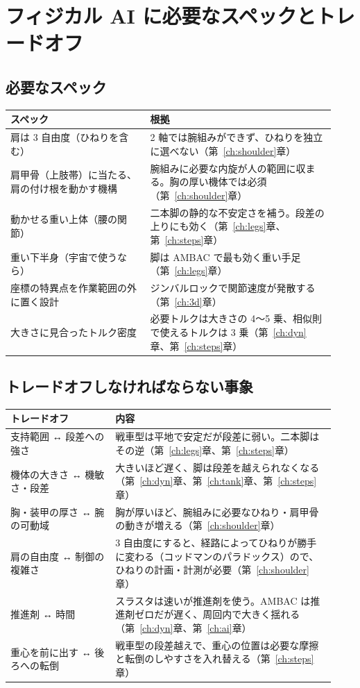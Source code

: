 \section{フィジカル AI に必要なスペックとトレードオフ}

\subsection{必要なスペック}

\begin{longtable}{p{0.40\linewidth}p{0.53\linewidth}}
\toprule
スペック & 根拠 \\ \midrule \endhead
肩は 3 自由度（ひねりを含む） & 2 軸では腕組みができず、ひねりを独立に選べない（第~\ref{ch:shoulder}章） \\
肩甲骨（上肢帯）に当たる、肩の付け根を動かす機構 & 腕組みに必要な内旋が人の範囲に収まる。胸の厚い機体では必須（第~\ref{ch:shoulder}章） \\
動かせる重い上体（腰の関節） & 二本脚の静的な不安定さを補う。段差の上りにも効く（第~\ref{ch:legs}章、第~\ref{ch:steps}章） \\
重い下半身（宇宙で使うなら） & 脚は AMBAC で最も効く重い手足（第~\ref{ch:legs}章） \\
座標の特異点を作業範囲の外に置く設計 & ジンバルロックで関節速度が発散する（第~\ref{ch:3d}章） \\
大きさに見合ったトルク密度 & 必要トルクは大きさの 4〜5 乗、相似則で使えるトルクは 3 乗（第~\ref{ch:dyn}章、第~\ref{ch:steps}章） \\
\bottomrule
\end{longtable}

\subsection{トレードオフしなければならない事象}

\begin{longtable}{p{0.30\linewidth}p{0.63\linewidth}}
\toprule
トレードオフ & 内容 \\ \midrule \endhead
支持範囲 ↔ 段差への強さ & 戦車型は平地で安定だが段差に弱い。二本脚はその逆（第~\ref{ch:legs}章、第~\ref{ch:steps}章） \\
機体の大きさ ↔ 機敏さ・段差 & 大きいほど遅く、脚は段差を越えられなくなる（第~\ref{ch:dyn}章、第~\ref{ch:tank}章、第~\ref{ch:steps}章） \\
胸・装甲の厚さ ↔ 腕の可動域 & 胸が厚いほど、腕組みに必要なひねり・肩甲骨の動きが増える（第~\ref{ch:shoulder}章） \\
肩の自由度 ↔ 制御の複雑さ & 3 自由度にすると、経路によってひねりが勝手に変わる（コッドマンのパラドックス）ので、ひねりの計画・計測が必要（第~\ref{ch:shoulder}章） \\
推進剤 ↔ 時間 & スラスタは速いが推進剤を使う。AMBAC は推進剤ゼロだが遅く、周回内で大きく揺れる（第~\ref{ch:dyn}章、第~\ref{ch:ai}章） \\
重心を前に出す ↔ 後ろへの転倒 & 戦車型の段差越えで、重心の位置は必要な摩擦と転倒のしやすさを入れ替える（第~\ref{ch:steps}章） \\
\bottomrule
\end{longtable}

